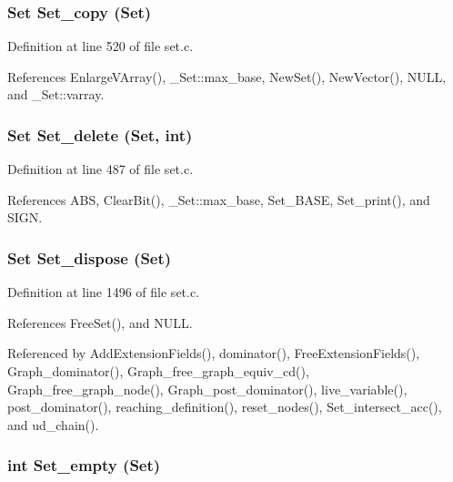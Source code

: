 \subsubsection{\setlength{\rightskip}{0pt plus 5cm}\bf{Set} Set\_\-copy (\bf{Set})}\label{set_8h_168d1b3d5543404ce048cf684262c388}




Definition at line 520 of file set.c.

References Enlarge\-VArray(), \_\-Set::max\_\-base, New\-Set(), New\-Vector(), NULL, and \_\-Set::varray.
\subsubsection{\setlength{\rightskip}{0pt plus 5cm}\bf{Set} Set\_\-delete (\bf{Set}, int)}\label{set_8h_a6418d5e6a322799a6bdb3c58db79e1a}




Definition at line 487 of file set.c.

References ABS, Clear\-Bit(), \_\-Set::max\_\-base, Set\_\-BASE, Set\_\-print(), and SIGN.
\subsubsection{\setlength{\rightskip}{0pt plus 5cm}\bf{Set} Set\_\-dispose (\bf{Set})}\label{set_8h_09010de5f4932b6c94d143aebbf9283d}




Definition at line 1496 of file set.c.

References Free\-Set(), and NULL.

Referenced by Add\-Extension\-Fields(), dominator(), Free\-Extension\-Fields(), Graph\_\-dominator(), Graph\_\-free\_\-graph\_\-equiv\_\-cd(), Graph\_\-free\_\-graph\_\-node(), Graph\_\-post\_\-dominator(), live\_\-variable(), post\_\-dominator(), reaching\_\-definition(), reset\_\-nodes(), Set\_\-intersect\_\-acc(), and ud\_\-chain().
\subsubsection{\setlength{\rightskip}{0pt plus 5cm}int Set\_\-empty (\bf{Set})}\label{set_8h_fe259712a3eb9ccf97162e7452752d17}





